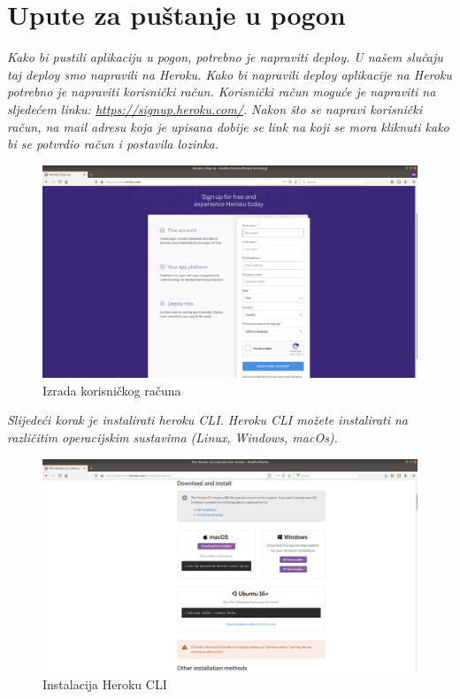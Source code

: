 			\eject
		
		\section{Upute za puštanje u pogon}
		
			 \textit{Kako bi pustili aplikaciju u pogon, potrebno je napraviti deploy. U našem slučaju taj deploy smo napravili na Heroku. 
		  	 \newline
		  	 Kako bi napravili deploy aplikacije na Heroku potrebno je napraviti korisnički račun. Korisnički račun moguće je napraviti na sljedećem linku: \url{https://signup.heroku.com/}. Nakon što se napravi korisnički račun, na mail adresu koja je upisana dobije se link na koji se mora kliknuti kako bi se potvrdio račun i postavila lozinka.}
			 
			 \begin{figure}[H]
			 	\includegraphics[scale=0.25]{slike/regHeroku.png}
			 	\centering
			 	\caption{Izrada korisničkog računa}
			 	\label{fig:promjene}
			 \end{figure}
		 
		 	\newpage
			 \textit{Slijedeći korak je instalirati heroku CLI. Heroku CLI možete instalirati na različitim operacijskim sustavima (Linux, Windows, macOs).}
			 
			 \begin{figure}[H]
			 	\includegraphics[scale=0.25]{slike/cliHeroku.png}
			 	\centering
			 	\caption{Instalacija Heroku CLI}
			 	\label{fig:promjene}
			 \end{figure}
			
